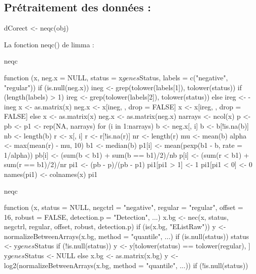 \documentclass[a4paper,10pt]{article}
\begin{document}
\subsection{Prétraitement des données :}
\begin{Schunk}
\begin{Sinput}
 dCorect <- neqc(obj)
\end{Sinput}
La fonction neqc() de limma :
\begin{Sinput}
 neqc
\end{Sinput}
\begin{Soutput}
function (x, neg.x = NULL, status = x$genes$Status, labels = c("negative", 
    "regular")) 
{
    if (is.null(neg.x)) {
        ineg <- grep(tolower(labels[1]), tolower(status))
        if (length(labels) > 1) {
            ireg <- grep(tolower(labels[2]), tolower(status))
        }
        else {
            ireg <- -ineg
        }
        x <- as.matrix(x)
        neg.x <- x[ineg, , drop = FALSE]
        x <- x[ireg, , drop = FALSE]
    }
    else {
        x <- as.matrix(x)
        neg.x <- as.matrix(neg.x)
    }
    narrays <- ncol(x)
    p <- pb <- p1 <- rep(NA, narrays)
    for (i in 1:narrays) {
        b <- neg.x[, i]
        b <- b[!is.na(b)]
        nb <- length(b)
        r <- x[, i]
        r <- r[!is.na(r)]
        nr <- length(r)
        mu <- mean(b)
        alpha <- max(mean(r) - mu, 10)
        b1 <- median(b)
        p1[i] <- mean(pexp(b1 - b, rate = 1/alpha))
        pb[i] <- (sum(b < b1) + sum(b == b1)/2)/nb
        p[i] <- (sum(r < b1) + sum(r == b1)/2)/nr
    }
    pi1 <- (pb - p)/(pb - p1)
    pi1[pi1 > 1] <- 1
    pi1[pi1 < 0] <- 0
    names(pi1) <- colnames(x)
    pi1
}
\end{Soutput}
\begin{Sinput}
 neqc
\end{Sinput}
\begin{Soutput}
function (x, status = NULL, negctrl = "negative", regular = "regular", 
    offset = 16, robust = FALSE, detection.p = "Detection", ...) 
{
    x.bg <- nec(x, status, negctrl, regular, offset, robust, 
        detection.p)
    if (is(x.bg, "EListRaw")) {
        y <- normalizeBetweenArrays(x.bg, method = "quantile", 
            ...)
        if (is.null(status)) 
            status <- y$genes$Status
        if (!is.null(status)) {
            y <- y[tolower(status) == tolower(regular), ]
            y$genes$Status <- NULL
        }
    }
    else {
        x.bg <- as.matrix(x.bg)
        y <- log2(normalizeBetweenArrays(x.bg, method = "quantile", 
            ...))
        if (!is.null(status)) 
}}
\end{Soutput}
\end{Schunk}
\end{document}
